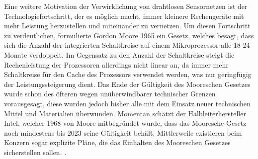Eine weitere Motivation der Verwirklichung von drahtlosen Sensornetzen ist der Technologiefortschritt, der es möglich macht, immer kleinere Rechengeräte mit mehr Leistung herzustellen und miteinander zu vernetzen. Um diesen Fortschritt zu verdeutlichen, formulierte Gordon Moore 1965 ein Gesetz, welches besagt, dass sich die Anzahl der integrierten Schaltkreise auf einem Mikroprozessor alle 18-24 Monate verdoppelt. Im Gegensatz zu den Anzahl der Schaltkreise steigt die Rechenleistung der Prozessoren allerdings nicht linear an, da immer mehr Schaltkreise für den Cache des Prozessors verwendet werden, was nur geringfügig der Leistungssteigerung dient. Das Ende der Gültigkeit des Mooreschen Gesetzes wurde schon des öfteren wegen unüberwindbarer technischer Grenzen vorausgesagt, diese wurden jedoch bisher alle mit dem Einsatz neuer technischen Mittel und Materialien überwunden. Momentan schätzt der Halbleiterhersteller Intel, welcher 1968 von Moore mitbegründet wurde, dass das Mooresche Gesetz noch mindestens bis 2023 seine Gültigkeit behält. Mittlerweile existieren beim Konzern sogar explizite Pläne, die das Einhalten des Mooreschen Gesetzes sicherstellen sollen.  \cite{d:wolf} \cite{d:kahle} \cite{d:tuomi}. \\
